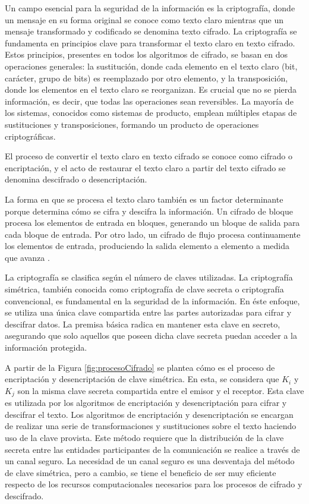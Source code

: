 Un campo esencial para la seguridad de la información es la criptografía, donde un mensaje en su forma original se conoce como texto claro mientras que un mensaje transformado y codificado se denomina texto cifrado. La criptografía se fundamenta en principios clave para transformar el texto claro en texto cifrado. Estos principios, presentes en todos los algoritmos de cifrado, se basan en dos operaciones generales: la sustitución, donde cada elemento en el texto claro (bit, carácter, grupo de bits) es reemplazado por otro elemento, y la transposición, donde los elementos en el texto claro se reorganizan. Es crucial que no se pierda información, es decir, que todas las operaciones sean reversibles. La mayoría de los sistemas, conocidos como sistemas de producto, emplean múltiples etapas de sustituciones y transposiciones, formando un producto de operaciones criptográficas.

El proceso de convertir el texto claro en texto cifrado se conoce como cifrado o encriptación, y el acto de restaurar el texto claro a partir del texto cifrado se denomina descifrado o desencriptación.

La forma en que se procesa el texto claro también es un factor determinante porque determina cómo se cifra y descifra la información. Un cifrado de bloque procesa los elementos de entrada en bloques, generando un bloque de salida para cada bloque de entrada. Por otro lado, un cifrado de flujo procesa continuamente los elementos de entrada, produciendo la salida elemento a elemento a medida que avanza \cite{schneier2007applied, stallings2005cryptography}.

La criptografía se clasifica según el número de claves utilizadas. La criptografía simétrica, también conocida como criptografía de clave secreta o criptografía convencional, es fundamental en la seguridad de la información. En éste enfoque, se utiliza una única clave compartida entre las partes autorizadas para cifrar y descifrar datos. La premisa básica radica en mantener esta clave en secreto, asegurando que solo aquellos que poseen dicha clave secreta puedan acceder a la información protegida. 

A partir de la Figura \ref{fig:procesoCifrado} se plantea cómo es el proceso de encriptación y desencriptación de clave simétrica. En esta, se considera que $K_i$ y $K_j$ son la misma clave secreta compartida entre el emisor y el receptor. Esta clave es utilizada por los algoritmos de encriptación y desencriptación para cifrar y descifrar el texto. Los algoritmos de encriptación y desencriptación se encargan de realizar una serie de transformaciones y sustituciones sobre el texto haciendo uso de la clave provista. Este método requiere que la distribución de la clave secreta entre las entidades participantes de la comunicación se realice a través de un canal seguro. La necesidad de un canal seguro es una desventaja del método de clave simétrica, pero a cambio, se tiene el beneficio de ser muy eficiente respecto de los recursos computacionales necesarios para los procesos de cifrado y descifrado.


